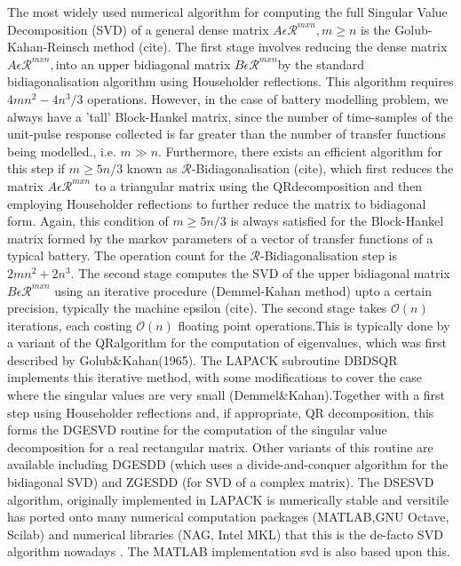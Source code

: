 The most widely used numerical algorithm for computing the full Singular
Value Decomposition (SVD) of a general dense matrix $A\epsilon\mathcal{R}^{mxn},m\geq n$
is the Golub-Kahan-Reinsch method (cite). The first stage involves
reducing the dense matrix $A\epsilon\mathcal{R}^{mxn},$into an upper
bidiagonal matrix $B\epsilon\mathcal{R}^{mxn}$by the standard bidiagonalisation
algorithm using Householder reflections. This algorithm requires $4mn^{2}-4n^{3}/3$
operations. However, in the case of battery modelling problem, we
always have a 'tall' Block-Hankel matrix, since the number of time-samples
of the unit-pulse response collected is far greater than the number
of transfer functions being modelled., i.e. $m\gg n$. Furthermore,
there exists an efficient algorithm for this step if $m\geq5n/3$
known as $\mathcal{R}$-Bidiagonalisation (cite), which first reduces
the matrix $A\epsilon\mathcal{R}^{mxn}$ to a triangular matrix using
the QR\LyXFourPerEmSpace decomposition and then employing Householder
reflections to further reduce the matrix to bidiagonal form. Again,
this condition of $m\geq5n/3$ is always satisfied for the Block-Hankel
matrix formed by the markov parameters of a vector of transfer functions
of a typical battery. The operation count for the $\mathcal{R}$-Bidiagonalisation
step is $2mn^{2}+2n^{3}$. The second stage computes the SVD of the
upper bidiagonal matrix $B\epsilon\mathcal{R}^{mxn}$ using an iterative
procedure (Demmel-Kahan method) upto a certain precision, typically
the machine epsilon (cite). The second stage takes $\mathcal{O}(n)$iterations,
each costing $\mathcal{O}(n)$ floating point operations.This is typically
done by a variant of the QR\LyXFourPerEmSpace algorithm for the computation
of eigenvalues, which was first described by Golub\LyXFourPerEmSpace \&\LyXFourPerEmSpace Kahan\LyXFourPerEmSpace (1965).
The LAPACK subroutine DBDSQR implements this iterative method, with
some modifications to cover the case where the singular values are
very small (Demmel\LyXFourPerEmSpace \&\LyXFourPerEmSpace Kahan).Together
with a first step using Householder reflections and, if appropriate,
QR decomposition, this forms the DGESVD routine for the computation
of the singular value decomposition for a real rectangular matrix.
Other variants of this routine are available including DGESDD (which
uses a divide-and-conquer algorithm for the bidiagonal SVD) and ZGESDD
(for SVD of a complex matrix). The DSESVD algorithm, originally implemented
in LAPACK is numerically stable and versitile has ported onto many
numerical computation packages (MATLAB,GNU Octave, Scilab) and numerical
libraries (NAG, Intel MKL) that this is the de-facto SVD algorithm
nowadays . The MATLAB implementation svd is also based upon this.


